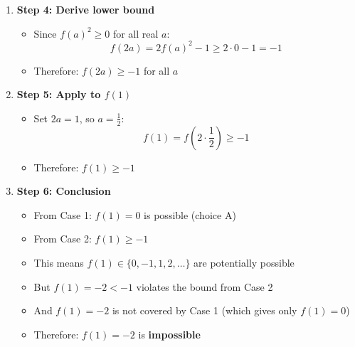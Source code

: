 \documentclass[12pt]{article}
\begin{document}
\begin{techniquesbox}
\begin{itemize}[leftmargin=*]
\begin{enumerate}
        \item \textbf{Step 4: Derive lower bound}
        \begin{itemize}
            \item Since $f(a)^2 \geq 0$ for all real $a$:
            \[f(2a) = 2f(a)^2 - 1 \geq 2 \cdot 0 - 1 = -1\]
            \item Therefore: $f(2a) \geq -1$ for all $a$
        \end{itemize}
        
        \item \textbf{Step 5: Apply to $f(1)$}
        \begin{itemize}
            \item Set $2a = 1$, so $a = \frac{1}{2}$:
            \[f(1) = f(2 \cdot \frac{1}{2}) \geq -1\]
            \item Therefore: $f(1) \geq -1$
        \end{itemize}
        
        \item \textbf{Step 6: Conclusion}
        \begin{itemize}
            \item From Case 1: $f(1) = 0$ is possible (choice A)
            \item From Case 2: $f(1) \geq -1$
            \item This means $f(1) \in \{0, -1, 1, 2, \ldots\}$ are potentially possible
            \item But $f(1) = -2 < -1$ violates the bound from Case 2
            \item And $f(1) = -2$ is not covered by Case 1 (which gives only $f(1) = 0$)
            \item Therefore: $f(1) = -2$ is \textbf{impossible}
        \end{itemize}
    \end{enumerate}
\end{itemize}


\end{techniquesbox}
\end{document}
